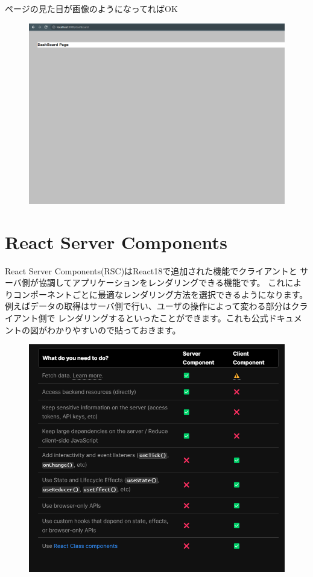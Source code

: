 ページの見た目が画像のようになってればOK


\begin{figure}[H]
  \centering
  \includegraphics[width=12cm]{./image/03-Tech/chap4/03.png}
\end{figure}









\section{React Server Components}
React Server Components(RSC)はReact18で追加された機能でクライアントと
サーバ側が協調してアプリケーションをレンダリングできる機能です。
これによりコンポーネントごとに最適なレンダリング方法を選択できるようになります。
例えばデータの取得はサーバ側で行い、ユーザの操作によって変わる部分はクライアント側で
レンダリングするといったことができます。これも公式ドキュメントの図がわかりやすいので貼っておきます。


\begin{figure}[H]
  \centering
  \includegraphics[width=12cm]{./image/03-Tech/chap4/04.png}
\end{figure}



